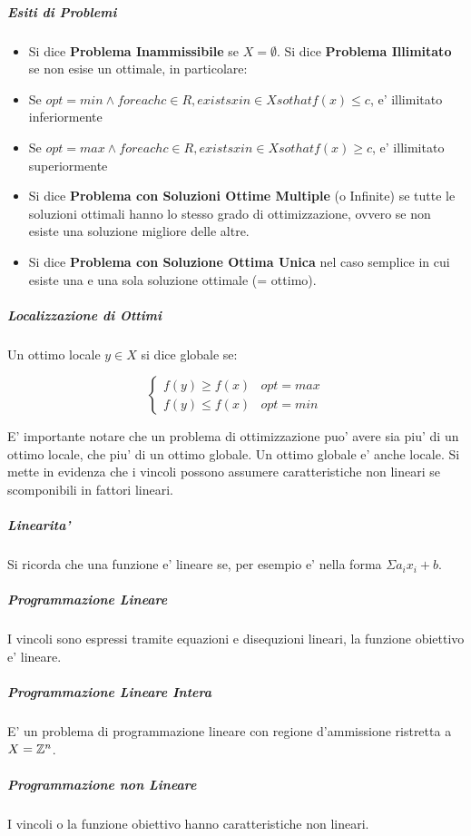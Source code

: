 \subparagraph{Esiti di Problemi}

\begin{itemize}
    \item Si dice \textbf{Problema Inammissibile} se $X = \emptyset$.
    Si dice \textbf{Problema Illimitato} se non esise un ottimale, in particolare:
    \item Se $opt = min \land for each c \in R, exists x in \in X so that f(x) \leq c$, e' illimitato inferiormente
    \item Se $opt = max \land for each c \in R, exists x in \in X so that f(x) \geq c$, e' illimitato superiormente
    \item Si dice \textbf{Problema con Soluzioni Ottime Multiple} (o Infinite) se tutte le soluzioni ottimali hanno lo stesso grado di ottimizzazione, ovvero se non esiste una soluzione migliore delle altre.
    \item Si dice \textbf{Problema con Soluzione Ottima Unica} nel caso semplice in cui esiste una e una sola soluzione ottimale (= ottimo).
\end{itemize}

\subparagraph{Localizzazione di Ottimi}

Un ottimo locale $y \in X$ si dice globale se:

\[
    \begin{cases}
        \text{$f(y) \geq f(x)$} & \text{$opt = max$} \\
        \text{$f(y) \leq f(x)$} & \text{$opt = min$}
    \end{cases}
\]

E' importante notare che un problema di ottimizzazione puo' avere sia piu' di un ottimo locale, che piu' di un ottimo globale.
Un ottimo globale e' anche locale.
Si mette in evidenza che i vincoli possono assumere caratteristiche non lineari se scomponibili in fattori lineari.

\subparagraph{Linearita'}
Si ricorda che una funzione e' lineare se, per esempio e' nella forma $\Sigma a_i x_i + b$.

\subparagraph{Programmazione Lineare}
I vincoli sono espressi tramite equazioni e disequzioni lineari, la funzione obiettivo e' lineare.

\subparagraph{Programmazione Lineare Intera}
E' un problema di programmazione lineare con regione d'ammissione ristretta a $X = \mathbb{Z}^n$.

\subparagraph{Programmazione non Lineare}
I vincoli o la funzione obiettivo hanno caratteristiche non lineari.

